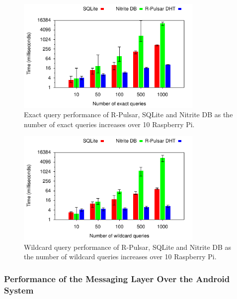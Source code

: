 \begin{figure}[h!]
  \includegraphics[width=0.8\textwidth]{Results/DBExactBar}
  \caption{Exact query performance of R-Pulsar, SQLite and Nitrite DB as the number of exact queries increases over 10 Raspberry Pi.}
  \label{fig:DBExactBar}
\end{figure}


\begin{figure}[h!]
  \includegraphics[width=0.8\textwidth]{Results/DBWildBar}
  \caption{Wildcard query performance of R-Pulsar, SQLite and Nitrite DB as the number of wildcard queries increases over 10 Raspberry Pi.}
  \label{fig:DBWildBar}
\end{figure}

\vspace{1ex}
\subsubsection{Performance of the Messaging Layer Over the Android System}
\hfill\vspace{1ex}


